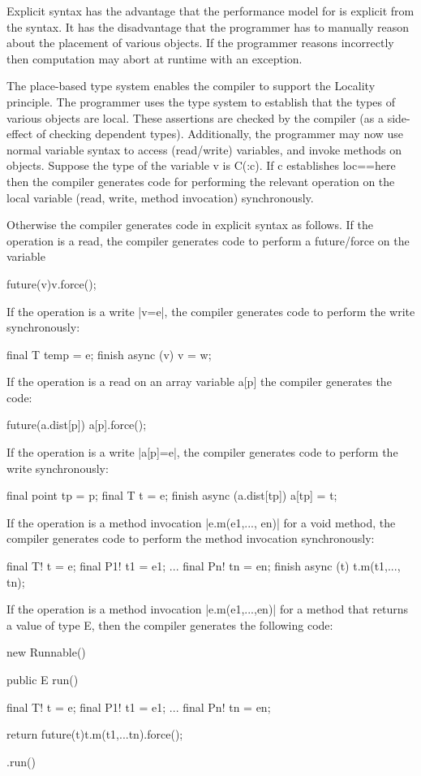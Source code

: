 Explicit syntax has the advantage that the performance model for \Xten{}
is explicit from the syntax. It has the disadvantage that the
programmer has to manually reason about the placement of various
objects. If the programmer reasons incorrectly then computation may
abort at runtime with an exception.

The place-based type system enables the compiler to support the
Locality principle. The programmer uses the type system to establish
that the types of various objects are local. These assertions are
checked by the compiler (as a side-effect of checking dependent
types). Additionally, the programmer may now use normal variable
syntax to access (read/write) variables, and invoke methods on
objects. Suppose the type of the variable v is C(:c). If c establishes
loc==here then the compiler generates code for performing the relevant
operation on the local variable (read, write, method invocation)
synchronously. 

Otherwise the compiler generates code in explicit syntax as
follows. If the operation is a read, the compiler generates code to
perform a future/force on the variable

\begin{x10}
  future(v){v}.force();  
\end{x10}

If the operation is a write |v=e|, the compiler generates code to perform
the write synchronously:

\begin{x10}
  final T temp = e;
  finish async (v){ v = w;}
\end{x10}

If the operation is a read on an array variable a[p] the compiler
generates the code:

\begin{x10}
  future(a.dist[p]){ a[p]}.force();  
\end{x10}


If the operation is a write |a[p]=e|, the compiler generates code to perform
the write synchronously:

\begin{x10}
  final point tp = p;
  final T t = e;
  finish async (a.dist[tp]){ a[tp] = t;}
\end{x10}

If the operation is a method invocation |e.m(e1,..., en)| for a void
method, the compiler generates code to perform the method invocation
synchronously:

\begin{x10}
  final T! t = e;
  final P1! t1 = e1;
  ...
  final Pn! tn = en;
  finish async (t){ 
    t.m(t1,..., tn);
  }  
\end{x10}


If the operation is a method invocation |e.m(e1,...,en)| for a method
that returns a value of type E, then the compiler generates the
following code:

\begin{x10}
  new Runnable() {
  public E run() {
    final T! t = e;
    final P1! t1 = e1;
    ...
    final Pn! tn = en;
  
    return future(t){t.m(t1,...tn)}.force();
  }}.run()
\end{x10}


